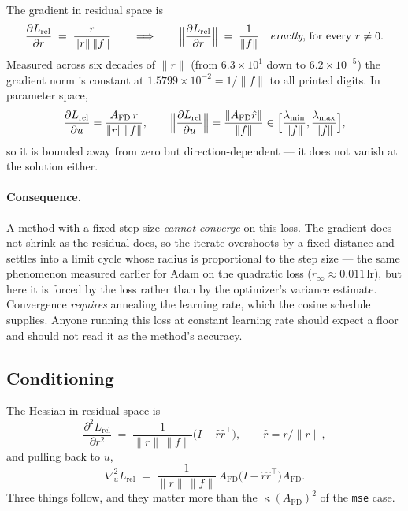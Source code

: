 \documentclass[11pt]{article}
\newcommand{\Afd}{A_{\mathrm{FD}}}
\DeclareMathOperator{\cond}{\kappa}
\begin{document}
The gradient in residual space is
\begin{equation}
  \frac{\partial L_{\mathrm{rel}}}{\partial r} \;=\; \frac{r}{\|r\|\,\|f\|}
  \qquad\Longrightarrow\qquad
  \Bigl\| \frac{\partial L_{\mathrm{rel}}}{\partial r} \Bigr\| \;=\; \frac{1}{\|f\|}
  \quad\text{\emph{exactly}, for every } r\neq0 .
\end{equation}
Measured across six decades of $\|r\|$ (from $6.3\times10^{1}$ down to $6.2\times10^{-5}$) the
gradient norm is constant at $1.5799\times10^{-2} = 1/\|f\|$ to all printed digits. In parameter
space,
\begin{equation}
  \frac{\partial L_{\mathrm{rel}}}{\partial u} = \frac{\Afd\, r}{\|r\|\,\|f\|},
  \qquad
  \Bigl\|\frac{\partial L_{\mathrm{rel}}}{\partial u}\Bigr\|
  = \frac{\|\Afd \hat r\|}{\|f\|}
  \in \Bigl[ \frac{\lambda_{\min}}{\|f\|}, \frac{\lambda_{\max}}{\|f\|} \Bigr],
\end{equation}
so it is bounded away from zero but direction-dependent --- it does not vanish at the solution
either.

\paragraph{Consequence.} A method with a fixed step size \emph{cannot converge} on this loss. The
gradient does not shrink as the residual does, so the iterate overshoots by a fixed distance and
settles into a limit cycle whose radius is proportional to the step size --- the same phenomenon
measured earlier for Adam on the quadratic loss ($r_\infty \approx 0.011\,\mathrm{lr}$), but here
it is forced by the loss rather than by the optimizer's variance estimate. Convergence
\emph{requires} annealing the learning rate, which the cosine schedule supplies. Anyone running
this loss at constant learning rate should expect a floor and should not read it as the method's
accuracy.

\subsection{Conditioning}

The Hessian in residual space is
\begin{equation}
  \frac{\partial^2 L_{\mathrm{rel}}}{\partial r^2}
  \;=\; \frac{1}{\|r\|\,\|f\|}\bigl( I - \hat r \hat r^\top \bigr),
  \qquad \hat r = r/\|r\| ,
\end{equation}
and pulling back to $u$,
\begin{equation}
  \nabla^2_u L_{\mathrm{rel}}
  \;=\; \frac{1}{\|r\|\,\|f\|}\, \Afd \bigl( I - \hat r \hat r^\top \bigr) \Afd .
  \label{eq:relhess}
\end{equation}
Three things follow, and they matter more than the $\cond(\Afd)^2$ of the \texttt{mse} case.
\end{document}
